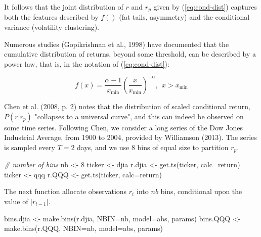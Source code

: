 \documentclass[
  11pt,
]{article}
\newenvironment{Shaded}{\begin{snugshade}}{\end{snugshade}}
\newcommand{\AttributeTok}[1]{\textcolor[rgb]{0.77,0.63,0.00}{#1}}
\newcommand{\CommentTok}[1]{\textcolor[rgb]{0.56,0.35,0.01}{\textit{#1}}}
\newcommand{\DecValTok}[1]{\textcolor[rgb]{0.00,0.00,0.81}{#1}}
\newcommand{\FunctionTok}[1]{\textcolor[rgb]{0.00,0.00,0.00}{#1}}
\newcommand{\NormalTok}[1]{#1}
\newcommand{\OtherTok}[1]{\textcolor[rgb]{0.56,0.35,0.01}{#1}}
\newcommand{\StringTok}[1]{\textcolor[rgb]{0.31,0.60,0.02}{#1}}
\begin{document}
It follows that the joint distribution of \(r\) and \(r_p\) given by
(\ref{eq:cond-dist}) captures both the features described by \(f()\)
(fat tails, asymmetry) and the conditional variance (volatility
clustering).

Numerous studies (Gopikrishnan et al., 1998) have
documented that the cumulative distribution of returns, beyond some
threshold, can be described by a power law, that is, in the notation of
(\ref{eq:cond-dist}):

\begin{equation}
f \left( x \right) = \frac{\alpha-1}{x_{\mbox{min}}} \left( \frac{x}{x_{\mbox{min}}} \right)^{-\alpha}, \ \ x>x_{\mbox{min}}
\label{eq:power-law}
\end{equation}

Chen et al. (2008, p. 2) notes that the distribution of scaled conditional
return, \(P(r | r_p)\) "collapses to a universal curve", and this can
indeed be observed on some time series. Following Chen, we consider a
long series of the Dow Jones Industrial Average, from 1900 to 2004,
provided by Williamson (2013). The series is sampled every \(T=2\) days, and
we use 8 bins of equal size to partition \(r_p\).

\begin{Shaded}
\begin{Highlighting}[]
\CommentTok{\# number of bins}
\NormalTok{nb }\OtherTok{\textless{}{-}} \DecValTok{8}
\NormalTok{ticker }\OtherTok{\textless{}{-}} \StringTok{\textquotesingle{}djia\textquotesingle{}}
\NormalTok{r.djia }\OtherTok{\textless{}{-}} \FunctionTok{get.ts}\NormalTok{(ticker, }\AttributeTok{calc=}\StringTok{\textquotesingle{}return\textquotesingle{}}\NormalTok{)}
\NormalTok{ticker }\OtherTok{\textless{}{-}} \StringTok{\textquotesingle{}qqq\textquotesingle{}}
\NormalTok{r.QQQ }\OtherTok{\textless{}{-}} \FunctionTok{get.ts}\NormalTok{(ticker, }\AttributeTok{calc=}\StringTok{\textquotesingle{}return\textquotesingle{}}\NormalTok{)}
\end{Highlighting}
\end{Shaded}

The next function allocate observations \(r_t\) into \(nb\) bins, conditional upon the value of \(|r_{t-1}|\).

\begin{Shaded}
\begin{Highlighting}[]
\NormalTok{bins.djia }\OtherTok{\textless{}{-}} \FunctionTok{make.bins}\NormalTok{(r.djia, }\AttributeTok{NBIN=}\NormalTok{nb, }\AttributeTok{model=}\StringTok{\textquotesingle{}abs\textquotesingle{}}\NormalTok{, params)}
\NormalTok{bins.QQQ }\OtherTok{\textless{}{-}} \FunctionTok{make.bins}\NormalTok{(r.QQQ, }\AttributeTok{NBIN=}\NormalTok{nb, }\AttributeTok{model=}\StringTok{\textquotesingle{}abs\textquotesingle{}}\NormalTok{, params)}
\end{Highlighting}
\end{Shaded}
\end{document}
